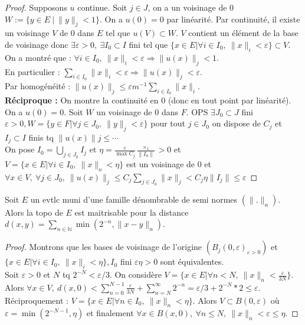 \begin{proof}
   Supposons $u$ continue. Soit $j\in J$, on a un voisinage de 0 \\$W:=\{y\in E\ |\ \|y\|_j<1\} $. On a $u(0)=0$ par linéarité. Par continuité, il existe un voisinage $V$ de 0 dans $E$ tel que $u(V)\subset W$. $V$ contient un élément de la base de voisinage donc $\exists \varepsilon >0,\ \exists I_0\subset I$ fini tel que $\{x\in E|\forall i\in I_0,\ \|x\|_i<\varepsilon  \} \subset V$.\\
   On a montré que : $\forall i\in I_0,\ \|x\|_i<\varepsilon \Rightarrow \|u(x)\|_j<1$. \\
   En particulier : $\sum\limits_{i\in I_0}^{} \|x\|_i<\varepsilon \Rightarrow \|u(x)\|_j<\varepsilon $.\\
   Par homogénéité : $\|u(x)\|_j\le \varepsilon m^{-1} \sum\limits_{i\in I_0}^{} \|x\|_i$.\\
   \textbf{Réciproque :} On montre la continuité en 0 (donc en tout point par linéarité).\\
   On a $u(0)=0$. Soit $W$ un voisinage de 0 dans $F$. OPS $\exists J_0\subset J$ fini $\varepsilon >0, W=\{y\in F|\forall j\in J_0,\ \|y\|_j<\varepsilon  \} $ pour tout $j\in J_0$ on dispose de $C_j$ et $I_j\subset I$ finis tq $\|u(x)\|j\le \cdots$\\
   On pose $I_0=\bigcup_{j\in J_0}I_j$ et $\eta=\frac{\varepsilon}{\max C_j}\frac{\times_1}{\|I_0\|}>0$ et $V=\{x\in E|\forall i\in I_0,\ \|x\|_o<\eta \}$ est un voisinage de 0 et $\forall x\in V,\ \forall j\in J_0,\ \|u(x)\|_j\le C_j \sum\limits_{j\in J_0}^{} \|x\|_j<C_j\eta\|I_j\|\le \varepsilon $
\end{proof}

\begin{propriete}
    Soit $E$ un evtlc muni d'une famille dénombrable de semi normes $(\|.\|_n)$. Alors la topo de $E$ est maitrisable pour la distance $d(x,y)=\sum\limits_{n\in \mathbb{N} }^{} \min(2^{-n}, \|x-y\|_n)$.
\end{propriete}
\begin{proof}
    Montrons que les bases de voisinage de l'origine $(B_j(0,\varepsilon )_{\varepsilon >0})$ et $\{x\in E| \forall i\in I_0,\ \|x\|_i<\eta \}, I_0$ fini $\varepsilon \eta>0$ sont équivalentes.\\
    Soit $\varepsilon >0$ et $N$ tq $2^{-N}<\varepsilon /3$. On considère $V=\{x\in E|\forall n<N,\ \|x\|_n<\frac{\varepsilon}{3N} \} $. Alors $\forall x\in V,\ d(x,0)<\sum\limits_{n=0}^{N-1} \frac{\varepsilon}{3N}+\sum\limits_{n=N}^{\infty} 2^{-n}=\varepsilon /3+2^{-N}*2\le \varepsilon $.\\
    Réciproquement : $V=\{x\in E|\forall n\in I_0,\ \|x\|_n<\eta \}$. Alors $V\subset B(0,\varepsilon )$ où $\varepsilon =\min(2^{-N-1},\eta)$ et finalement $\forall x\in B(x,0),\ \forall n\le N,\ \|x\|_n<\varepsilon \le \eta$.

\end{proof}


